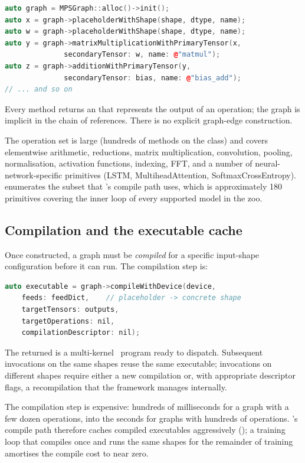\begin{lstlisting}[style=lucidcpp,language=C++]
auto graph = MPSGraph::alloc()->init();
auto x = graph->placeholderWithShape(shape, dtype, name);
auto w = graph->placeholderWithShape(shape, dtype, name);
auto y = graph->matrixMultiplicationWithPrimaryTensor(x,
              secondaryTensor: w, name: @"matmul");
auto z = graph->additionWithPrimaryTensor(y,
              secondaryTensor: bias, name: @"bias_add");
// ... and so on
\end{lstlisting}

Every method returns an  that represents the
output of an operation; the graph is implicit in the chain of
references. There is no explicit graph-edge construction.

The operation set is large (hundreds of methods on the
 class) and covers elementwise arithmetic,
reductions, matrix multiplication, convolution, pooling,
normalisation, activation functions, indexing, FFT, and a number of
neural-network-specific primitives (LSTM, MultiheadAttention,
SoftmaxCrossEntropy).  enumerates the subset
that \Lucid's compile path uses, which is approximately 180
primitives covering the inner loop of every supported model in the
zoo.

\subsection{Compilation and the executable cache}
\label{ssec:metal_mpsgraph:compilation}

Once constructed, a graph must be \emph{compiled} for a specific
input-shape configuration before it can run. The compilation step
is:

\begin{lstlisting}[style=lucidcpp,language=C++]
auto executable = graph->compileWithDevice(device,
    feeds: feedDict,    // placeholder -> concrete shape
    targetTensors: outputs,
    targetOperations: nil,
    compilationDescriptor: nil);
\end{lstlisting}

The returned  is a multi-kernel
\Metal\ program ready to dispatch. Subsequent invocations on the
same shapes reuse the same executable; invocations on different
shapes require either a new compilation or, with appropriate
descriptor flags, a recompilation that the framework manages
internally.

The compilation step is expensive: hundreds of milliseconds for a
graph with a few dozen operations, into the seconds for graphs with
hundreds of operations. \Lucid's compile path therefore caches
compiled executables aggressively
(); a training loop that compiles once and runs the same shapes for the
remainder of training amortises the compile cost to near zero.


